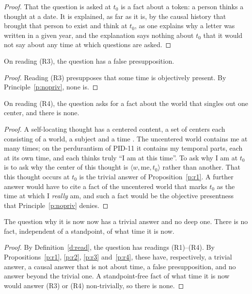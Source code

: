 \documentclass{situationist-preprint}
\begin{document}
\begin{proof}
That the question is asked at $t_0$ is a fact about a token: a person thinks a thought at a date. It is explained, as far as it is, by the causal history that brought that person to exist and think at $t_0$, as one explains why a letter was written in a given year, and the explanation says nothing about $t_0$ that it would not say about any time at which questions are asked.
\end{proof}

\begin{proposition}\label{p:r3}
On reading (R3), the question has a false presupposition.
\end{proposition}

\begin{proof}
Reading (R3) presupposes that some time is objectively present. By Principle~\ref{p:nopriv}, none is.
\end{proof}

\begin{proposition}\label{p:r4}
On reading (R4), the question asks for a fact about the world that singles out one center, and there is none.
\end{proposition}

\begin{proof}
A self-locating thought has a centered content, a set of centers each consisting of a world, a subject and a time \citep{Lewis1979}. The uncentered world contains me at many times; on the perdurantism of PID-11 it contains my temporal parts, each at its own time, and each thinks truly \enquote{I am at this time}. To ask why I am at $t_0$ is to ask why the center of this thought is $\langle w, \text{me}, t_0\rangle$ rather than another. That this thought occurs at $t_0$ is the trivial answer of Proposition~\ref{p:r1}. A further answer would have to cite a fact of the uncentered world that marks $t_0$ as the time at which I \emph{really} am, and such a fact would be the objective presentness that Principle~\ref{p:nopriv} denies.
\end{proof}

\begin{theorem}\label{t:main}
The question why it is now now has a trivial answer and no deep one. There is no fact, independent of a standpoint, of what time it is now.
\end{theorem}

\begin{proof}
By Definition~\ref{d:read}, the question has readings (R1)--(R4). By Propositions~\ref{p:r1}, \ref{p:r2}, \ref{p:r3} and~\ref{p:r4}, these have, respectively, a trivial answer, a causal answer that is not about time, a false presupposition, and no answer beyond the trivial one. A standpoint-free fact of what time it is now would answer (R3) or (R4) non-trivially, so there is none.
\end{proof}
\end{document}
